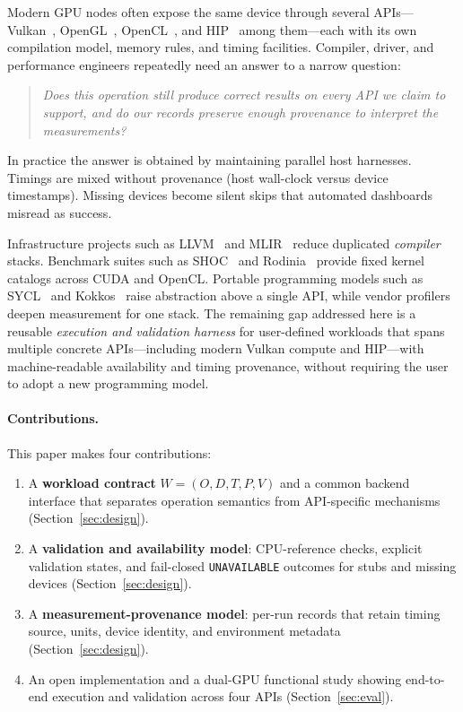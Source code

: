 \documentclass[11pt,a4paper]{article}
\begin{document}
Modern GPU nodes often expose the same device through several
APIs---Vulkan~\cite{vulkan14}, OpenGL~\cite{opengl43},
OpenCL~\cite{opencl30}, and HIP~\cite{hipdocs} among them---each with its own
compilation model, memory rules, and timing facilities. Compiler, driver, and
performance engineers repeatedly need an answer to a narrow question:

\begin{quote}
\small\itshape
Does this operation still produce correct results on every API we claim to
support, and do our records preserve enough provenance to interpret the
measurements?
\end{quote}

In practice the answer is obtained by maintaining parallel host harnesses.
Timings are mixed without provenance (host wall-clock versus device
timestamps). Missing devices become silent skips that automated dashboards
misread as success.

Infrastructure projects such as LLVM~\cite{lattner2004llvm} and
MLIR~\cite{lattner2020mlir} reduce duplicated \emph{compiler} stacks.
Benchmark suites such as SHOC~\cite{danalis2010shoc} and
Rodinia~\cite{che2009rodinia} provide fixed kernel catalogs across CUDA and
OpenCL. Portable programming models such as SYCL~\cite{sycl2020} and
Kokkos~\cite{trott2022kokkos} raise abstraction above a single API, while
vendor profilers~\cite{nsight,rocprof} deepen measurement for one stack.
The remaining gap addressed here is a reusable \emph{execution and validation
harness} for user-defined workloads that spans multiple concrete APIs---including
modern Vulkan compute and HIP---with machine-readable availability and timing
provenance, without requiring the user to adopt a new programming model.

\paragraph{Contributions.}
This paper makes four contributions:
\begin{enumerate}
  \item A \textbf{workload contract} $W=(O,D,T,P,V)$ and a common backend
        interface that separates operation semantics from API-specific
        mechanisms (Section~\ref{sec:design}).
  \item A \textbf{validation and availability model}: CPU-reference checks,
        explicit validation states, and fail-closed \texttt{UNAVAILABLE}
        outcomes for stubs and missing devices (Section~\ref{sec:design}).
  \item A \textbf{measurement-provenance model}: per-run records that retain
        timing source, units, device identity, and environment metadata
        (Section~\ref{sec:design}).
  \item An open implementation and a dual-GPU functional study showing
        end-to-end execution and validation across four APIs
        (Section~\ref{sec:eval}).
\end{enumerate}
\end{document}
